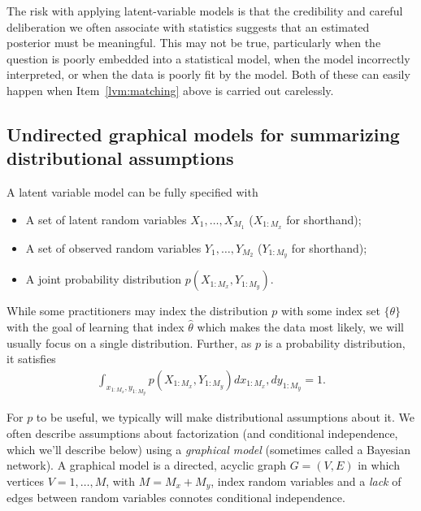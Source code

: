   The risk with applying latent-variable models is that the
  credibility and careful deliberation we often associate with
  statistics suggests that an estimated posterior must be meaningful.
  This may not be true, particularly when the question is poorly
  embedded into a statistical model, when the model incorrectly
  interpreted, or when the data is poorly fit by the model.  Both of
  these can easily happen when Item~\ref{lvm:matching} above is carried out
  carelessly.

\subsection{Undirected graphical models for summarizing distributional assumptions}
A latent variable model can be fully specified with
\begin{itemize}
  \item A set of latent random variables $X_1, \ldots, X_{M_1}$ ($X_{1:M_x}$ for shorthand);
  \item A set of observed random variables $Y_1, \ldots, Y_{M_2}$ ($Y_{1:M_y}$ for shorthand);
  \item A joint probability distribution $p(X_{1:M_x}, Y_{1:M_y})$.
\end{itemize}
While some practitioners may index the distribution $p$ with some
index set $\{ \theta \}$ with the goal of learning that index $\hat
\theta$ which makes the data most likely, we will usually focus on a
single distribution.  Further, as $p$ is a probability distribution,
it satisfies
\begin{align*}
  \int_{x_{1:M_x}, y_{1:M_y}} p(X_{1:M_x}, Y_{1:M_y}) d x_{1:M_x}, d
  y_{1:M_y} = 1.
\end{align*}
  
For $p$ to be useful, we typically will make distributional
assumptions about it.  We often describe assumptions about
factorization (and conditional independence, which we'll describe
below) using a \emph{graphical model} (sometimes called a Bayesian
network).  A graphical model is a directed, acyclic graph $G = (V, E)$
in which vertices $V=1, \ldots, M$, with $M = M_x + M_y$, index random
variables and a \emph{lack} of edges between random variables connotes
conditional independence.

